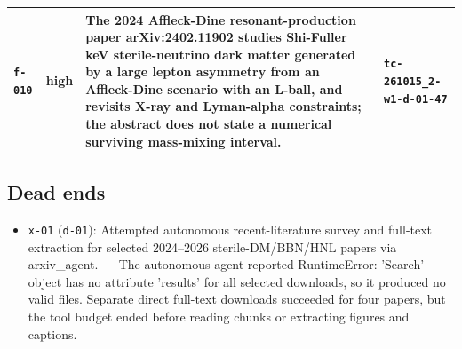 \documentclass[11pt,a4paper]{article}
\begin{document}
\begin{longtable}{@{}p{}p{}p{}p{}@{}}
\texttt{f-010} & high & The 2024 Affleck-Dine resonant-production paper arXiv:2402.11902 studies Shi-Fuller keV sterile-neutrino dark matter generated by a large lepton asymmetry from an Affleck-Dine scenario with an L-ball, and revisits X-ray and Lyman-alpha constraints; the abstract does not state a numerical surviving mass-mixing interval. & \texttt{tc-261015\_\allowbreak{}2-w1-d-01-47} \\
\bottomrule\end{longtable}
\subsection{Dead ends}
\begin{itemize}
  \item \texttt{x-01} (\texttt{d-01}): Attempted autonomous recent-literature survey and full-text extraction for selected 2024--2026 sterile-DM/BBN/HNL papers via arxiv\_agent. --- The autonomous agent reported RuntimeError: 'Search' object has no attribute 'results' for all selected downloads, so it produced no valid files. Separate direct full-text downloads succeeded for four papers, but the tool budget ended before reading chunks or extracting figures and captions.
\end{itemize}
\end{document}

